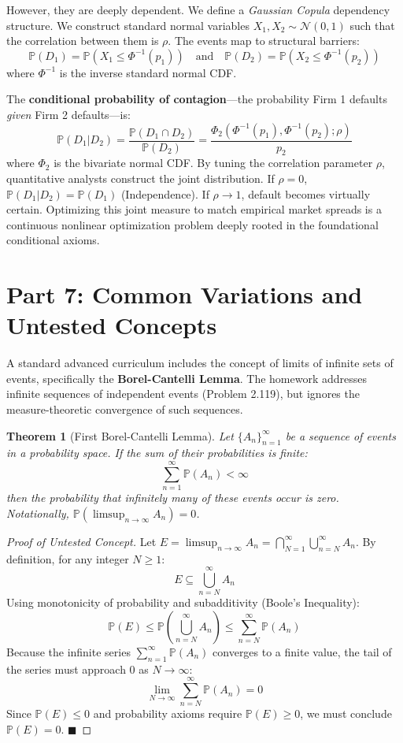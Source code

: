 \documentclass[12pt]{article}
\newtheorem{theorem}{Theorem}[section]
\theoremstyle{definition}
\theoremstyle{remark}
\begin{document}
However, they are deeply dependent. We define a \textit{Gaussian Copula} dependency structure. We construct standard normal variables $X_1, X_2 \sim \mathcal{N}(0,1)$ such that the correlation between them is $\rho$. 
The events map to structural barriers:
\[ \mathbb{P}(D_1) = \mathbb{P}(X_1 \le \Phi^{-1}(p_1)) \quad \text{and} \quad \mathbb{P}(D_2) = \mathbb{P}(X_2 \le \Phi^{-1}(p_2)) \]
where $\Phi^{-1}$ is the inverse standard normal CDF. 

The \textbf{conditional probability of contagion}—the probability Firm 1 defaults \textit{given} Firm 2 defaults—is:
\[ \mathbb{P}(D_1 | D_2) = \frac{\mathbb{P}(D_1 \cap D_2)}{\mathbb{P}(D_2)} = \frac{\Phi_2(\Phi^{-1}(p_1), \Phi^{-1}(p_2); \rho)}{p_2} \]
where $\Phi_2$ is the bivariate normal CDF. By tuning the correlation parameter $\rho$, quantitative analysts construct the joint distribution. If $\rho = 0$, $\mathbb{P}(D_1 | D_2) = \mathbb{P}(D_1)$ (Independence). If $\rho \to 1$, default becomes virtually certain. Optimizing this joint measure to match empirical market spreads is a continuous nonlinear optimization problem deeply rooted in the foundational conditional axioms.

\newpage
\section{Part 7: Common Variations and Untested Concepts}

A standard advanced curriculum includes the concept of limits of infinite sets of events, specifically the \textbf{Borel-Cantelli Lemma}. The homework addresses infinite sequences of independent events (Problem 2.119), but ignores the measure-theoretic convergence of such sequences.

\begin{theorem}[First Borel-Cantelli Lemma]
Let $\{A_n\}_{n=1}^\infty$ be a sequence of events in a probability space. If the sum of their probabilities is finite:
\[ \sum_{n=1}^\infty \mathbb{P}(A_n) < \infty \]
then the probability that infinitely many of these events occur is zero. Notationally, $\mathbb{P}(\limsup_{n \to \infty} A_n) = 0$.
\end{theorem}

\begin{proof}[Proof of Untested Concept]
Let $E = \limsup_{n \to \infty} A_n = \bigcap_{N=1}^\infty \bigcup_{n=N}^\infty A_n$.
By definition, for any integer $N \ge 1$:
\[ E \subseteq \bigcup_{n=N}^\infty A_n \]
Using monotonicity of probability and subadditivity (Boole's Inequality):
\[ \mathbb{P}(E) \le \mathbb{P}\left( \bigcup_{n=N}^\infty A_n \right) \le \sum_{n=N}^\infty \mathbb{P}(A_n) \]
Because the infinite series $\sum_{n=1}^\infty \mathbb{P}(A_n)$ converges to a finite value, the tail of the series must approach 0 as $N \to \infty$:
\[ \lim_{N \to \infty} \sum_{n=N}^\infty \mathbb{P}(A_n) = 0 \]
Since $\mathbb{P}(E) \le 0$ and probability axioms require $\mathbb{P}(E) \ge 0$, we must conclude $\mathbb{P}(E) = 0$. $\blacksquare$
\end{proof}
\end{document}
